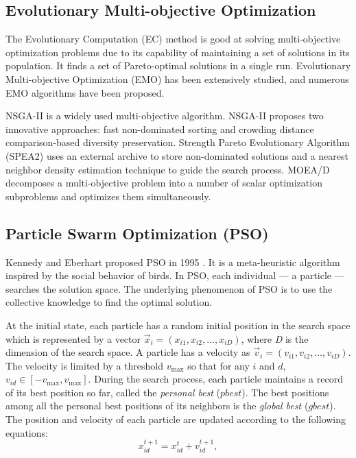 \documentclass[10pt,journal,compsoc]{IEEEtran}
\begin{document}
\subsection{Evolutionary Multi-objective Optimization}
The Evolutionary Computation (EC) method is good at solving multi-objective optimization problems due to its capability of maintaining a set of solutions in its population. It finds a set of Pareto-optimal solutions in a single run. Evolutionary Multi-objective Optimization (EMO) has been extensively studied, and numerous EMO algorithms have been proposed.

NSGA-II \cite{nsgaii} is a widely used multi-objective algorithm. NSGA-II proposes two innovative approaches: fast non-dominated sorting and crowding distance comparison-based diversity preservation. 
Strength Pareto Evolutionary Algorithm (SPEA2)\cite{kim2004spea2} uses an external archive to store non-dominated solutions and a nearest neighbor density estimation technique to guide the search process. MOEA/D \cite{zhang2007moea} decomposes a multi-objective problem into a number of scalar optimization subproblems and optimizes them simultaneously.

\vspace{-3 mm}

\subsection{Particle Swarm Optimization (PSO)}
Kennedy and Eberhart proposed PSO in 1995 \cite{kennedy2011particle}. It is a meta-heuristic algorithm inspired by the social behavior of birds. In PSO, each individual --- a particle --- searches the solution space. The underlying phenomenon of PSO is to use the collective knowledge to find the optimal solution.

At the initial state, each particle has a random initial position in the search space which is represented by a vector $\vec{x}_i = (x_{i1}, x_{i2}, \dots, x_{iD})$, where \emph{D} is the dimension of the search space. A particle has a velocity as $\vec{v}_i = (v_{i1}, v_{i2}, \dots, v_{iD})$. The velocity is limited by a threshold $v_{\max}$ so that for any $i$ and $d$, $v_{id} \in [-v_{\max}, v_{\max}]$. During the search process, each particle maintains a record of its best position so far, called the \emph{personal best} ($pbest$). The best positions among all the personal best positions of its neighbors is the \emph{global best} ($gbest$). The position and velocity of each particle are updated according to the following equations:
\vspace{-1 mm}
\small
\begin{equation}
\label{eq:updatePosition}
 x^{t+1}_{id} = x^{t}_{id} + v^{t+1}_{id},
\end{equation}
\end{document}
